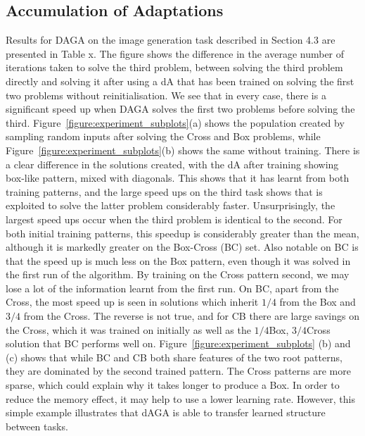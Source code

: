 \documentclass[runningheads,a4paper]{llncs}
\begin{document}
\subsection{Accumulation of Adaptations}
Results for DAGA on the image generation task described in Section 4.3 are presented in Table x. The figure shows the difference in the average number of iterations taken to solve the third problem, between solving the third problem directly and solving it after using a dA that has been trained on solving the first two problems without reinitialisation. We see that in every case, there is a significant speed up when DAGA solves the first two problems before solving the third. Figure~\ref{figure:experiment_subplots}(a) shows the population created by sampling random inputs after solving the Cross and Box problems, while Figure~\ref{figure:experiment_subplots}(b) shows the same without training. There is a clear difference in the solutions created, with the dA after training showing box-like pattern, mixed with diagonals. This shows that it has learnt from both training patterns, and the large speed ups on the third task shows that is exploited to solve the latter problem considerably faster. Unsurprisingly, the largest speed ups occur when the third problem is identical to the second. For both initial training patterns, this speedup is considerably greater than the mean, although it is markedly greater on the Box-Cross (BC) set. Also notable on BC is that the speed up is much less on the Box pattern, even though it was solved in the first run of the algorithm. By training on the Cross pattern second, we may lose a lot of the information learnt from the first run. On BC, apart from the Cross, the most speed up is seen in solutions which inherit \(1/4\) from the Box and \(3/4\) from the Cross. The reverse is not true, and for CB there are large savings on the Cross, which it was trained on initially as well as the \(1/4\)Box, \(3/4\)Cross solution that BC performs well on. Figure~\ref{figure:experiment_subplots} (b) and (c) shows that while BC and CB both share features of the two root patterns, they are dominated by the second trained pattern. The Cross patterns are more sparse, which could explain why it takes longer to produce a Box. In order to reduce the memory effect, it may help to use a lower learning rate. However, this simple example illustrates that dAGA is able to transfer learned structure between tasks.
\end{document}

